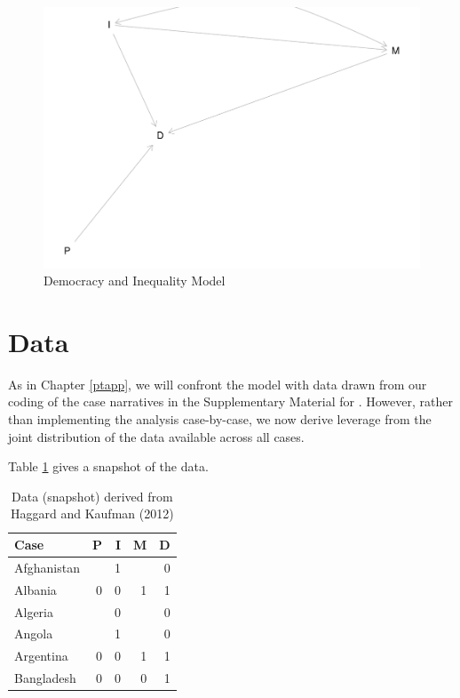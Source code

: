 \documentclass[
  12pt,
]{book}
\begin{document}
\begin{figure}
\centering
\includegraphics{ii_files/figure-latex/pimdgraph-1.pdf}
\caption{\label{fig:pimdgraph}Democracy and Inequality Model}
\end{figure}

\hypertarget{data}{%
\section{Data}\label{data}}

As in Chapter \ref{ptapp}, we will confront the model with data drawn from our coding of the case narratives in the Supplementary Material for \citet{haggard2012inequality}. However, rather than implementing the analysis case-by-case, we now derive leverage from the joint distribution of the data available across all cases.

Table \ref{tab:data82} gives a snapshot of the data.

\begin{table}

\caption{\label{tab:data82}Data (snapshot) derived from Haggard and Kaufman (2012)}
\centering
\begin{tabular}[t]{lrrrr}
\toprule
Case & P & I & M & D\\
\midrule
Afghanistan &  & 1 &  & 0\\
Albania & 0 & 0 & 1 & 1\\
Algeria &  & 0 &  & 0\\
Angola &  & 1 &  & 0\\
Argentina & 0 & 0 & 1 & 1\\
\addlinespace
Bangladesh & 0 & 0 & 0 & 1\\
\bottomrule
\end{tabular}
\end{table}
\end{document}
